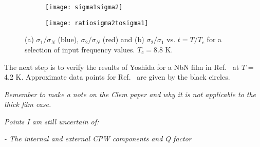     \begin{figure}[H]
    \centering
    \begin{subfigure}[b]{0.45\textwidth}
        \centering
        \texttt{[image: sigma1sigma2]}
        \caption{\label{fig:sigma1sigma2}}
    \end{subfigure}
         \begin{subfigure}[b]{0.45\textwidth}
        \centering
        \texttt{[image: ratiosigma2tosigma1]}
   \caption{\label{fig:ratiosigma2tosigma1}}
   \end{subfigure}
   \caption{(a) $\sigma_{1} / \sigma_{N}$ (blue), $\sigma_{2} / \sigma_{N}$ (red) and (b) $\sigma_{2} / \sigma_{1}$ vs. $t=T/T_{c}$ for a selection of input frequency values. $T_{c} = 8.8$ K.}
   \label{fig:mairflaigthesisreplicate}
    \end{figure}

The next step is to verify the results of Yoshida for a NbN film in Ref.~\citep{402973} at $T$ = 4.2 K. Approximate data points for Ref.~\citep{402973} are given by the black circles.   



\noindent \textit{Remember to make a note on the Clem paper and why it is not applicable to the thick film case.}

\noindent \textit{Points I am still uncertain of:}



\noindent \textit{- The internal and external CPW components and Q factor}